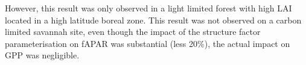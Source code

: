 \documentclass[a4paper,11pt]{report}
\begin{document}
However, this result was only observed in a light limited forest with high LAI located in a high latitude boreal zone. This result was not observed on a carbon limited savannah site, even though the impact of the structure factor parameterisation on fAPAR was substantial (less 20\%), the actual  impact on GPP was negligible. 

\newpage
\pagestyle{plain}


\end{document}
